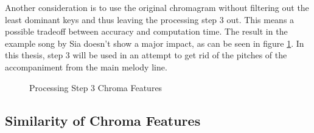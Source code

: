 Another consideration is to use the original chromagram without filtering out the least dominant keys and thus leaving the processing step 3 out. This means a possible tradeoff between accuracy and computation time. The result in the example song by Sia doesn't show a major impact, as can be seen in figure \ref{fig:nomax}. In this thesis, step 3 will be used in an attempt to get rid of the pitches of the accompaniment from the main melody line.
\begin{figure}[htbp]
	\centering
	\caption{Processing Step 3 Chroma Features}
	\label{fig:nomax}
\end{figure}

\subsection{Similarity of Chroma Features}

